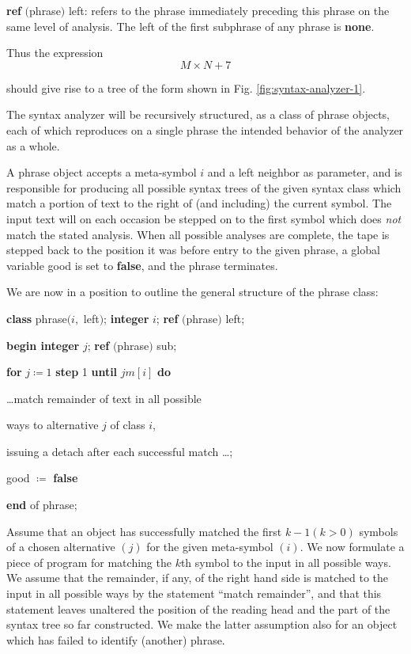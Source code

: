 \parindent\quad \textbf{ref} $($phrase$)$ left: refers to the phrase immediately preceding this phrase on the same level of analysis. The left of the first subphrase of any phrase is \textbf{none}.

\noindent
Thus the expression
$$
M\times N + 7
$$

\noindent
should give rise to a tree of the form shown in Fig. \ref{fig:syntax-analyzer-1}.

The syntax analyzer will be recursively structured, as a class of phrase objects, each of which reproduces on a single phrase the intended behavior of the analyzer as a whole.

A phrase object accepts a meta-symbol $i$ and a left neighbor as parameter, and is responsible for producing all possible syntax trees of the given syntax class which match a portion of text to the right of (and including) the current symbol. The input text will on each occasion be stepped on to the first symbol which does \textit{not} match the stated analysis. When all possible analyses are complete, the tape is stepped back to the position it was before entry to the given phrase, a global variable good is set to \textbf{false}, and the phrase terminates.

We are now in a position to outline the general structure of the phrase class:

\quad \textbf{class} phrase$(i,$ left$)$; \textbf{integer} $i$; \textbf{ref} $($phrase$)$ left;

\quad \quad \textbf{begin integer} $j$; \textbf{ref} $($phrase$)$ sub;

\quad \quad \quad \textbf{for} $j\coloneq 1$ \textbf{step} 1 \textbf{until} $jm[i]$ \textbf{do}

\quad \quad \quad \quad \dots match remainder of text in all possible

\quad \quad \quad \quad ways to alternative $j$ of class $i$,

\quad \quad \quad \quad issuing a detach after each successful match \dots;

\quad \quad \quad good $\coloneq$ \textbf{false}

\quad \textbf{end} of phrase;

Assume that an object has successfully matched the first $k - 1(k > 0)$ symbols of a chosen alternative $(j)$ for the given meta-symbol $(i)$. We now formulate a piece of program for matching the $k$th symbol to the input in all possible ways. We assume that the remainder, if any, of the right hand side is matched to the input in all possible ways by the statement ``match remainder'', and that this statement leaves unaltered the position of the reading head and the part of the syntax tree so far constructed. We make the latter assumption also for an object which has failed to identify (another) phrase.

